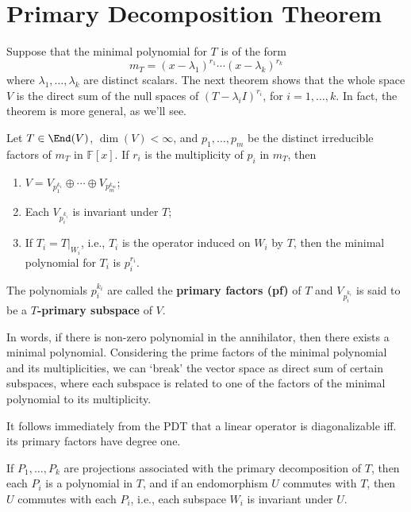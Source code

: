 \section{Primary Decomposition Theorem}\label{sec:pdt}

Suppose that the minimal polynomial for $T$ is of the form
\[
  m_T = (x - \lambda_1)^{r_1} \cdots (x - \lambda_k)^{r_k}
\]
where $\lambda_1, \ldots, \lambda_k$ are distinct scalars. The next theorem shows that the whole space $V$ is the direct sum of the null spaces of $(T - \lambda_i I)^{r_i}$, for $i = 1, \ldots, k$. In fact, the theorem is more general, as we'll see.

\begin{theorem}\label{thm:pdt}
  Let $T \in \End(V)$, $\dim(V) < \infty$, and $p_1, \ldots, p_m$ be the distinct irreducible factors of $m_T$ in $\mathbb{F}[x]$. If $r_i$ is the multiplicity of $p_i$ in $m_T$, then
  \begin{enumerate}
    \item $V = V_{p_1^{k_1}} \oplus \cdots \oplus V_{p_m^{k_m}}$;
    \item Each $V_{p_i^{k_i}}$ is invariant under $T$;
    \item If $T_i = T|_{W_i}$, i.e., $T_i$ is the operator induced on $W_i$ by $T$, then the minimal polynomial for $T_i$ is $p_i^{r_i}$.
  \end{enumerate}
	The polynomials $p_i^{k_i}$ are called the \textbf{primary factors (pf)} of $T$ and $V_{p_i^{k_i}}$ is said to be a \textbf{$T$-primary subspace} of $V$.
\end{theorem}

In words, if there is non-zero polynomial in the annihilator, then there exists a minimal polynomial. Considering the prime factors of the minimal polynomial and its multiplicities, we can `break' the vector space as direct sum of certain subspaces, where each subspace is related to one of the factors of the minimal polynomial to its multiplicity.

It follows immediately from the PDT that a linear operator is diagonalizable iff. its primary factors have degree one.

\begin{corollary}
  If $P_1, \ldots, P_k$ are projections associated with the primary decomposition of $T$, then each $P_i$ is a polynomial in $T$, and if an endomorphism $U$ commutes with $T$, then $U$ commutes with each $P_i$, i.e., each subspace $W_i$ is invariant under $U$.
\end{corollary}

